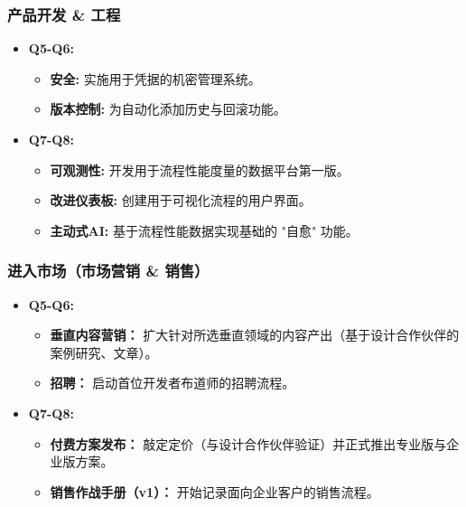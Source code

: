 \documentclass[11pt, a4paper, oneside]{article}
\begin{document}
\subsubsection{产品开发 \& 工程}
\begin{itemize}[leftmargin=*]
    \item \textbf{Q5-Q6:}
    \begin{itemize}
        \item \textbf{安全:} 实施用于凭据的机密管理系统。
        \item \textbf{版本控制:} 为自动化添加历史与回滚功能。
    \end{itemize}
    \item \textbf{Q7-Q8:}
    \begin{itemize}
        \item \textbf{可观测性:} 开发用于流程性能度量的数据平台第一版。
        \item \textbf{改进仪表板:} 创建用于可视化流程的用户界面。
        \item \textbf{主动式AI:} 基于流程性能数据实现基础的 "自愈" 功能。
    \end{itemize}
\end{itemize}



\subsubsection{进入市场（市场营销 \& 销售）}
\begin{itemize}[leftmargin=*]
    \item \textbf{Q5-Q6:}
    \begin{itemize}
        \item \textbf{垂直内容营销：} 扩大针对所选垂直领域的内容产出（基于设计合作伙伴的案例研究、文章）。
        \item \textbf{招聘：} 启动首位开发者布道师的招聘流程。
    \end{itemize}
    \item \textbf{Q7-Q8:}
    \begin{itemize}
        \item \textbf{付费方案发布：} 敲定定价（与设计合作伙伴验证）并正式推出专业版与企业版方案。
        \item \textbf{销售作战手册（v1）：} 开始记录面向企业客户的销售流程。
    \end{itemize}
\end{itemize}
\end{document}
